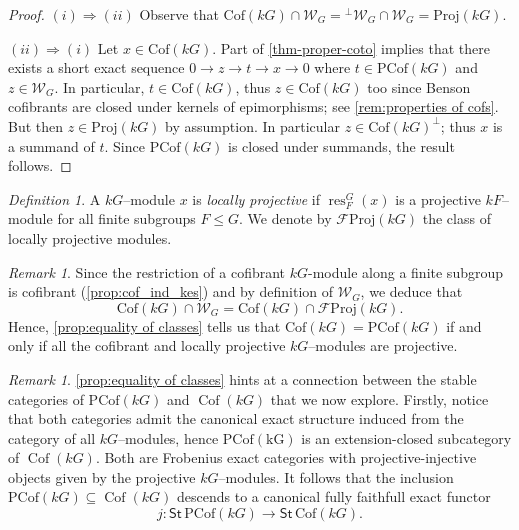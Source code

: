 \documentclass{amsart}
\newcommand{\res}{\operatorname{res}\nolimits}
\def \Wfin{{\mathcal W}_{G}}
\DeclareMathOperator{\Cof}{Cof}
\numberwithin{equation}{section}%
\theoremstyle{remark}
\newtheorem{definition}[equation]{Definition}
\newtheorem{remark}[equation]{Remark}
\begin{document}
{\begin{proof}
$(i)\Rightarrow(ii)$ Observe that $\mathrm{Cof}(kG)\cap\Wfin={}^\perp\Wfin\cap\Wfin = \mathrm{Proj}(kG)$.

$(ii)\Rightarrow(i)$ Let $x\in\mathrm{Cof}(kG)$. Part of \cref{thm-proper-coto} implies that there exists a short exact sequence $0\rightarrow z\rightarrow t\rightarrow x\rightarrow 0$ where $t\in \mathrm{PCof}(kG)$ and $z\in\Wfin$. In particular, $t\in\mathrm{Cof}(kG)$, thus $z\in\mathrm{Cof}(kG)$ too since Benson cofibrants are closed under kernels of epimorphisms; see \cref{rem:properties of cofs}. But then $z\in\mathrm{Proj}(kG)$ by assumption. In particular $z\in\mathrm{Cof}(kG)^{\perp}$; thus $x$ is a summand of $t$. Since $\mathrm{PCof}(kG)$ is closed under summands, the result follows.
\end{proof}

\begin{definition}
A $kG$--module $x$ is \textit{locally projective} if $\res^G_F(x)$ is a projective $kF$--module for all finite subgroups $F\leqslant G$. We denote by $\mathcal{F}\mathrm{Proj}(kG)$ the class of locally projective modules.    
\end{definition}


\begin{remark}
Since the restriction of a cofibrant $kG$-module along a finite subgroup is cofibrant (\cref{prop:cof_ind_kes}) and by definition of $\Wfin$, we deduce that 
\begin{equation}
\label{eq:equality with fproj}
\mathrm{Cof}(kG)\cap\Wfin=\mathrm{Cof}(kG)\cap\mathcal{F}\mathrm{Proj}(kG).
\end{equation}
Hence, \cref{prop:equality of classes} tells us that $\mathrm{Cof}(kG)=\mathrm{PCof}(kG)$ if and only if all the cofibrant and locally projective $kG$--modules are projective.
\end{remark}

\begin{remark}
\cref{prop:equality of classes} hints at a connection between the stable categories of $\mathrm{PCof}(kG)$ and $\Cof(kG)$ that we now explore. Firstly, notice that both categories admit the canonical exact structure induced from the  category of all $kG$--modules, hence  $\mathrm{PCof(kG)}$ is an extension-closed subcategory of $\Cof(kG)$. Both are Frobenius exact categories with projective-injective objects given by the projective $kG$--modules. It follows that the inclusion $\mathrm{PCof}(kG)\subseteq \Cof(kG)$ descends to a canonical fully faithfull exact functor 
    \begin{equation}
    \label{eq:exact_functor}
   j\colon  \mathsf{St}\, \mathrm{PCof}(kG)\to \mathsf{St}\,\mathrm{Cof}(kG).
\end{equation}
\end{remark}


}
\end{document}
